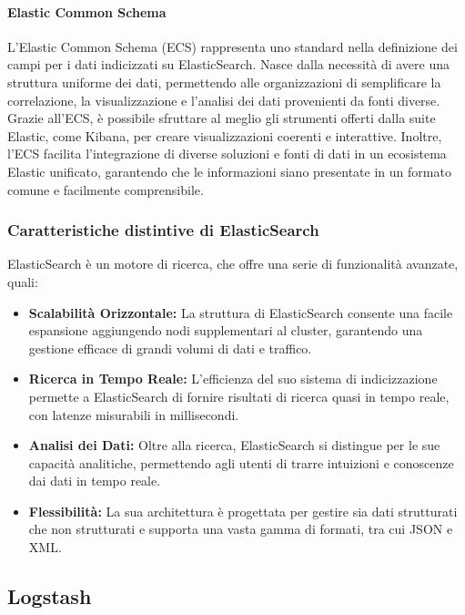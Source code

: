 \paragraph{Elastic Common Schema}\label{subsubsect:ECS}
L'Elastic Common Schema (ECS) rappresenta uno standard nella definizione dei campi per i dati indicizzati su ElasticSearch. Nasce dalla necessità di avere una struttura uniforme dei dati, permettendo alle organizzazioni di semplificare la correlazione, la visualizzazione e l'analisi dei dati provenienti da fonti diverse. Grazie all'ECS, è possibile sfruttare al meglio gli strumenti offerti dalla suite Elastic, come Kibana, per creare visualizzazioni coerenti e interattive. Inoltre, l'ECS facilita l'integrazione di diverse soluzioni e fonti di dati in un ecosistema Elastic unificato, garantendo che le informazioni siano presentate in un formato comune e facilmente comprensibile.


\subsubsection{Caratteristiche distintive di ElasticSearch}

ElasticSearch è un motore di ricerca, che offre una serie di funzionalità avanzate, quali:

\begin{itemize}
\item\textbf{Scalabilità Orizzontale:} La struttura di ElasticSearch consente una facile espansione aggiungendo nodi supplementari al cluster, garantendo una gestione efficace di grandi volumi di dati e traffico.
\item\textbf{Ricerca in Tempo Reale:} L'efficienza del suo sistema di indicizzazione permette a ElasticSearch di fornire risultati di ricerca quasi in tempo reale, con latenze misurabili in millisecondi.
\item\textbf{Analisi dei Dati:} Oltre alla ricerca, ElasticSearch si distingue per le sue capacità analitiche, permettendo agli utenti di trarre intuizioni e conoscenze dai dati in tempo reale.
\item\textbf{Flessibilità:} La sua architettura è progettata per gestire sia dati strutturati che non strutturati e supporta una vasta gamma di formati, tra cui JSON e XML.
\end{itemize}


\subsection{Logstash}

